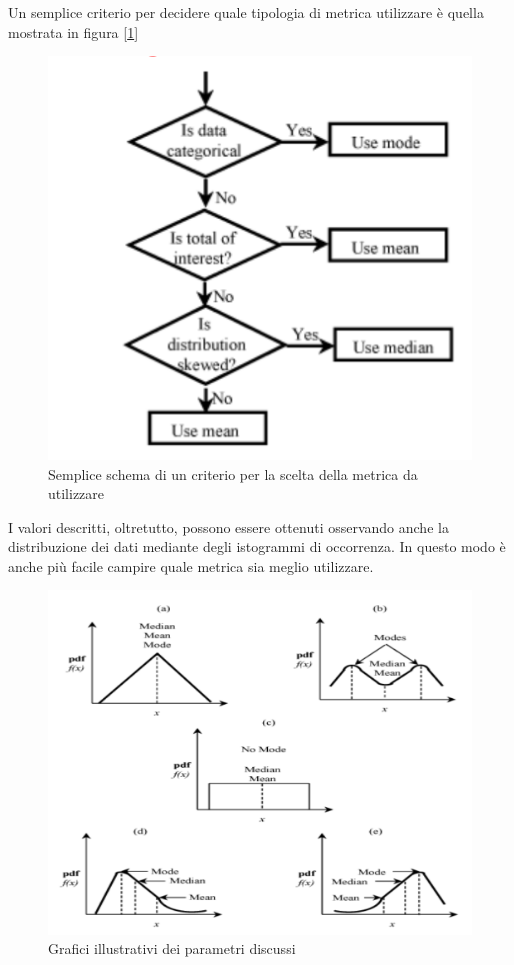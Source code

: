 Un semplice criterio per decidere quale tipologia di metrica utilizzare è quella mostrata in figura [\ref{img:criterio-media-mediana}]

\begin{figure}[h]
\centering
\includegraphics[width=.5\textwidth]{img/chapter-4/criterio-media-mediana.png}
\caption{Semplice schema di un criterio per la scelta della metrica da utilizzare}\label{img:criterio-media-mediana}
\end{figure}

I valori descritti, oltretutto, possono essere ottenuti osservando anche la distribuzione dei dati mediante degli istogrammi di occorrenza. In questo modo è anche più facile campire quale metrica sia meglio utilizzare.

\begin{figure}[H]
\centering
\includegraphics[width=.5\textwidth]{img/chapter-4/grafici-media-mediana.png}
\caption{Grafici illustrativi dei parametri discussi}\label{img:grafici-media-mediana}
\end{figure}

